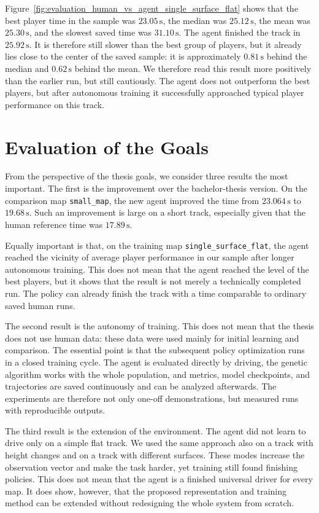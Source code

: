 Figure~\ref{fig:evaluation_human_vs_agent_single_surface_flat} shows that the best player time in the sample was \(23.05\,\mathrm{s}\), the median was \(25.12\,\mathrm{s}\), the mean was \(25.30\,\mathrm{s}\), and the slowest saved time was \(31.10\,\mathrm{s}\). The agent finished the track in \(25.92\,\mathrm{s}\). It is therefore still slower than the best group of players, but it already lies close to the center of the saved sample: it is approximately \(0.81\,\mathrm{s}\) behind the median and \(0.62\,\mathrm{s}\) behind the mean. We therefore read this result more positively than the earlier run, but still cautiously. The agent does not outperform the best players, but after autonomous training it successfully approached typical player performance on this track.

\section{Evaluation of the Goals}

From the perspective of the thesis goals, we consider three results the most important. The first is the improvement over the bachelor-thesis version. On the comparison map \texttt{small\_map}, the new agent improved the time from \(23.064\,\mathrm{s}\) to \(19.68\,\mathrm{s}\). Such an improvement is large on a short track, especially given that the human reference time was \(17.89\,\mathrm{s}\).

Equally important is that, on the training map \texttt{single\_surface\_flat}, the agent reached the vicinity of average player performance in our sample after longer autonomous training. This does not mean that the agent reached the level of the best players, but it shows that the result is not merely a technically completed run. The policy can already finish the track with a time comparable to ordinary saved human runs.

The second result is the autonomy of training. This does not mean that the thesis does not use human data: these data were used mainly for initial learning and comparison. The essential point is that the subsequent policy optimization runs in a closed training cycle. The agent is evaluated directly by driving, the genetic algorithm works with the whole population, and metrics, model checkpoints, and trajectories are saved continuously and can be analyzed afterwards. The experiments are therefore not only one-off demonstrations, but measured runs with reproducible outputs.

The third result is the extension of the environment. The agent did not learn to drive only on a simple flat track. We used the same approach also on a track with height changes and on a track with different surfaces. These modes increase the observation vector and make the task harder, yet training still found finishing policies. This does not mean that the agent is a finished universal driver for every \Trackmania{} map. It does show, however, that the proposed representation and training method can be extended without redesigning the whole system from scratch.

